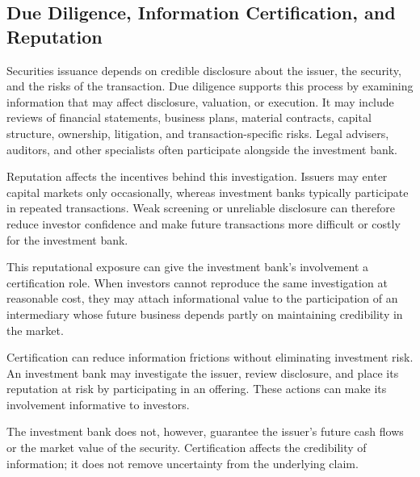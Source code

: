 \subsection[Due Diligence, Information Certification, and Reputation]{Due Diligence, Information Certification, and\\ Reputation}

Securities issuance depends on credible disclosure about the issuer, the security, and the risks of the transaction. Due diligence supports this process by examining information that may affect disclosure, valuation, or execution. It may include reviews of financial statements, business plans, material contracts, capital structure, ownership, litigation, and transaction-specific risks. Legal advisers, auditors, and other specialists often participate alongside the investment bank.

Reputation affects the incentives behind this investigation. Issuers may enter capital markets only occasionally, whereas investment banks typically participate in repeated transactions. Weak screening or unreliable disclosure can therefore reduce investor confidence and make future transactions more difficult or costly for the investment bank.

This reputational exposure can give the investment bank's involvement a certification role. When investors cannot reproduce the same investigation at reasonable cost, they may attach informational value to the participation of an intermediary whose future business depends partly on maintaining credibility in the market.


\begin{tcolorbox}[
  enhanced,
  breakable,
  colback=white,
  colframe=FinanceBlue,
  boxrule=0.7pt,
  sharp corners,
  borderline west={2.2pt}{0pt}{FinanceBlue},
  title=\textbf{Financial Perspective: Certification Is Not a Guarantee},
  coltitle=white,
  colbacktitle=FinanceBlue,
  fonttitle=\bfseries,
  before skip=1.2em,
  after skip=1.2em
]

Certification can reduce information frictions without eliminating investment risk. An investment bank may investigate the issuer, review disclosure, and place its reputation at risk by participating in an offering. These actions can make its involvement informative to investors.

The investment bank does not, however, guarantee the issuer's future cash flows or the market value of the security. Certification affects the credibility of information; it does not remove uncertainty from the underlying claim.

\end{tcolorbox}

